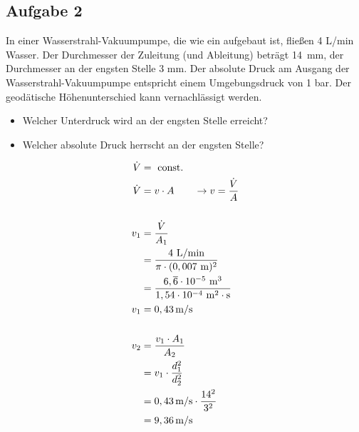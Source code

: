 \documentclass[a4paper,11pt]{article}
\begin{document}
\pagebreak
 
 





\subsection*{Aufgabe 2}
 
\begin{marginfigure}[+2cm]
 
\begin{marginfigure}[-2cm]
 
\caption{Beim Venturi-Rohr lässt sich die Fließgeschwindigkeit über den Höhenunterschied der angesaugten Flüssigkeit in einem Rohr ablesen, welches die Verengung mit dem normalen Rohrdurchmesser verbindet.}
\end{marginfigure}

In einer Wasserstrahl-Vakuumpumpe, die wie ein  aufgebaut ist, fließen 4 L/min Wasser. Der Durchmesser der Zuleitung (und Ableitung) beträgt \mbox{14 mm}, der Durchmesser an der engsten Stelle 3 mm. Der absolute Druck am Ausgang der Wasserstrahl-Vakuumpumpe entspricht einem Umgebungsdruck von 1 bar. Der geodätische Höhenunterschied kann vernachlässigt werden. 
\begin{itemize}
\item Welcher Unterdruck wird an der engsten Stelle erreicht? 
\item Welcher absolute Druck herrscht an der engsten Stelle?
\end{itemize}

 

\begin{align*}
\dot{V} &= ~\text{const.} \\
\dot{V} &= v \cdot A \qquad \rightarrow v = \frac{\dot{V}}{A} \\ \\
v_1 &= \frac{\dot{V}}{A_1} \\
	&= \frac{4~\text{L/min}}{\pi \cdot (0,007~\text{m})^2} \\
	&= \frac{6,\overline{6} \cdot 10^{-5} ~\text{m$^3$}}{1,54 \cdot 10^{-4}~\text{m}^2 \cdot \text{s}} \\
v_1 &= 0,43\mskip3mu \text{m}/\text{s} \\ \\
v_2 &= \frac{v_1 \cdot A_1}{A_2}\\
&= v_1 \cdot \frac{d_1^2}{d_2^2} \\
&= 0,43\mskip3mu \text{m/s} \cdot \frac{14^2}{3^2} \\
&=9,36\mskip3mu \text{m/s}
\end{align*}


\end{marginfigure}
\end{document}
